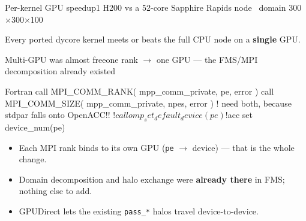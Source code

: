 \documentclass[aspectratio=169]{beamer}
\begin{document}
\begin{frame}{Per-kernel GPU speedup}{1 H200 vs a 52-core Sapphire Rapids node \textperiodcentered\ domain 300$\times$300$\times$100}
  \centering
  \vspace{.3em}

  \footnotesize Every ported dycore kernel meets or beats the full CPU node on a \textbf{single} GPU.
\end{frame}


\begin{frame}[fragile]{Multi-GPU was almost free}{one rank $\to$ one GPU --- the FMS/MPI decomposition already existed}
  \begin{cookiecode}[title={the entire multi-GPU setup}]{Fortran}
call MPI_COMM_RANK( mpp_comm_private, pe,   error )
call MPI_COMM_SIZE( mpp_comm_private, npes, error )
! need both, because stdpar falls onto OpenACC!!
!$    call omp_set_default_device (pe)
!$acc set device_num(pe)
  \end{cookiecode}
  \begin{itemize}
    \item Each MPI rank binds to its own GPU (\texttt{pe} $\to$ device) --- that is the whole change.
    \item Domain decomposition and halo exchange were \textbf{already there} in FMS; nothing else to add.
    \item GPUDirect lets the existing \texttt{pass\_*} halos travel device-to-device.
  \end{itemize}
\end{frame}
\end{document}
